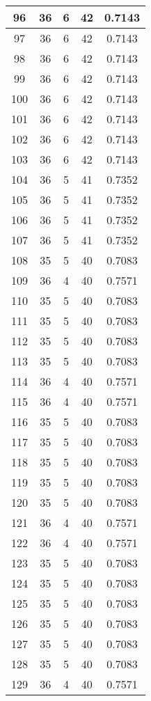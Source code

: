 \documentclass[letterpaper, 12pt]{article}
\begin{document}
\begin{longtable}{|c|c|c|c|c|}
\hline
96 & 36 & 6 & 42 & 0.7143 \\
\hline
97 & 36 & 6 & 42 & 0.7143 \\
\hline
98 & 36 & 6 & 42 & 0.7143 \\
\hline
99 & 36 & 6 & 42 & 0.7143 \\
\hline
100 & 36 & 6 & 42 & 0.7143 \\
\hline
101 & 36 & 6 & 42 & 0.7143 \\
\hline
102 & 36 & 6 & 42 & 0.7143 \\
\hline
103 & 36 & 6 & 42 & 0.7143 \\
\hline
104 & 36 & 5 & 41 & 0.7352 \\
\hline
105 & 36 & 5 & 41 & 0.7352 \\
\hline
106 & 36 & 5 & 41 & 0.7352 \\
\hline
107 & 36 & 5 & 41 & 0.7352 \\
\hline
108 & 35 & 5 & 40 & 0.7083 \\
\hline
109 & 36 & 4 & 40 & 0.7571 \\
\hline
110 & 35 & 5 & 40 & 0.7083 \\
\hline
111 & 35 & 5 & 40 & 0.7083 \\
\hline
112 & 35 & 5 & 40 & 0.7083 \\
\hline
113 & 35 & 5 & 40 & 0.7083 \\
\hline
114 & 36 & 4 & 40 & 0.7571 \\
\hline
115 & 36 & 4 & 40 & 0.7571 \\
\hline
116 & 35 & 5 & 40 & 0.7083 \\
\hline
117 & 35 & 5 & 40 & 0.7083 \\
\hline
118 & 35 & 5 & 40 & 0.7083 \\
\hline
119 & 35 & 5 & 40 & 0.7083 \\
\hline
120 & 35 & 5 & 40 & 0.7083 \\
\hline
121 & 36 & 4 & 40 & 0.7571 \\
\hline
122 & 36 & 4 & 40 & 0.7571 \\
\hline
123 & 35 & 5 & 40 & 0.7083 \\
\hline
124 & 35 & 5 & 40 & 0.7083 \\
\hline
125 & 35 & 5 & 40 & 0.7083 \\
\hline
126 & 35 & 5 & 40 & 0.7083 \\
\hline
127 & 35 & 5 & 40 & 0.7083 \\
\hline
128 & 35 & 5 & 40 & 0.7083 \\
\hline
129 & 36 & 4 & 40 & 0.7571 \\

\end{longtable}
\end{document}
